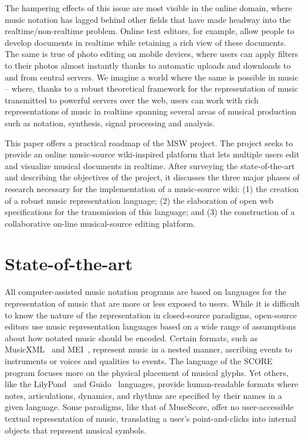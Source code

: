 \documentclass{article}
\begin{document}
The hampering effects of this issue are most visible in the online domain,
where music notation has lagged behind other fields that have made headway
into the realtime/non-realtime problem. Online text
editors, for example, allow people to develop documents in real\-time while
retaining a rich view of these documents. The same is true of photo editing
on mobile devices, where users can apply filters to their photos almost
instantly thanks to automatic uploads and downloads to and from central
servers. We imagine a world where the same is possible in music – where,
thanks to a robust theoretical framework for the representation of music
transmitted to powerful servers over the web, users can work with rich
representations of music in real\-time spanning several areas of musical
production such as notation, synthesis, signal processing and analysis.

This paper offers a practical roadmap
of the MSW project. The project seeks to provide an online music-source
wiki-inspired platform that lets multiple users edit and visualize
musical documents in realtime. After surveying the
state-of-the-art and describing the objectives of the project,
it discusses the three major phases of research necessary
for the implementation of a music-source wiki: (1) the creation of a robust
music representation language; (2) the elaboration of open web
specifications for the transmission of this language; and (3) the
construction of a collaborative on-line musical-source editing platform.
\section{State-of-the-art}\label{sec:state-of-the-art}

All computer-assisted music notation programs are based on languages for the
representation of music that are more or less exposed to users. While it is
difficult to know the nature of the representation in closed-source
paradigms, open-source editors use music representation languages based on a
wide range of assumptions about how notated music should be encoded. Certain
formats, such as MusicXML~\cite{good2001musicxml} and
MEI~\cite{roland2002music}, represent music in a nested manner,
ascribing events to instruments or voices and qualities to events. The language of the SCORE program focuses more on the physical
placement of musical glyphs. Yet others, like the LilyPond~\cite{lilypond06} and
Guido~\cite{hoos98}
languages, provide human-readable formats where notes, articulations,
dynamics, and rhythms are specified by their names in a given language. Some
paradigms, like that of MuseScore, offer no user-accessible textual representation
of music, translating a user’s point-and-clicks into internal objects that
represent musical symbols.
\end{document}
